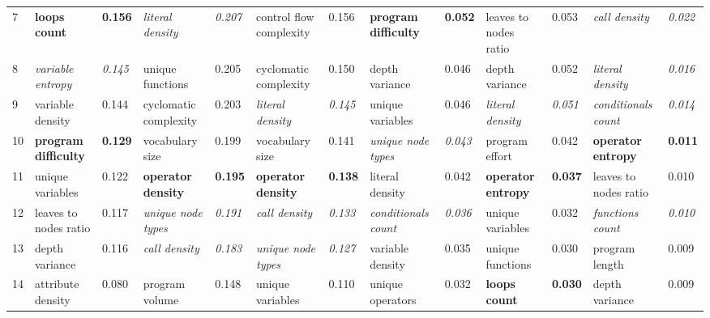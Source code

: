 \begin{table}[htbp]
{\begin{tabular}{lllllllllllll}
7    & \textbf{loops count}        & \textbf{0.156} & \textit{literal density}    & \textit{0.207} & control flow complexity     & 0.156          & \textbf{program difficulty} & \textbf{0.052} & leaves to nodes ratio       & 0.053          & \textit{call density}       & \textit{0.022} \\
8    & \textit{variable entropy}   & \textit{0.145} & unique functions            & 0.205          & cyclomatic complexity       & 0.150          & depth variance              & 0.046          & depth variance              & 0.052          & \textit{literal density}    & \textit{0.016} \\
9    & variable density            & 0.144          & cyclomatic complexity       & 0.203          & \textit{literal density}    & \textit{0.145} & unique variables            & 0.046          & \textit{literal density}    & \textit{0.051} & \textit{conditionals count} & \textit{0.014} \\
10   & \textbf{program difficulty} & \textbf{0.129} & vocabulary size             & 0.199          & vocabulary size             & 0.141          & \textit{unique node types}  & \textit{0.043} & program effort              & 0.042          & \textbf{operator entropy}   & \textbf{0.011} \\
11   & unique variables            & 0.122          & \textbf{operator density}   & \textbf{0.195} & \textbf{operator density}   & \textbf{0.138} & literal density             & 0.042          & \textbf{operator entropy}   & \textbf{0.037} & leaves to nodes ratio       & 0.010          \\
12   & leaves to nodes ratio       & 0.117          & \textit{unique node types}  & \textit{0.191} & \textit{call density}       & \textit{0.133} & \textit{conditionals count} & \textit{0.036} & unique variables            & 0.032          & \textit{functions count}    & \textit{0.010} \\
13   & depth variance              & 0.116          & \textit{call density}       & \textit{0.183} & \textit{unique node types}  & \textit{0.127} & variable density            & 0.035          & unique functions            & 0.030          & program length              & 0.009          \\
14   & attribute density           & 0.080          & program volume              & 0.148          & unique variables            & 0.110          & unique operators            & 0.032          & \textbf{loops count}        & \textbf{0.030} & depth variance              & 0.009          \\

\end{tabular}}
\end{table}
